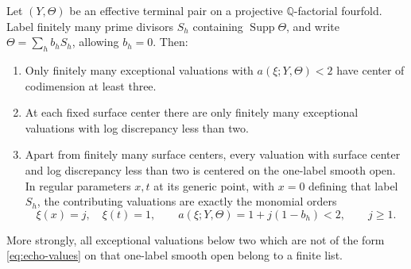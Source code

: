 \begin{lemma}\label{lem:echoes}
Let $(Y,\Theta)$ be an effective terminal pair on a projective $\mathbb Q$-factorial fourfold. Label finitely many prime divisors $S_h$ containing $\operatorname{Supp}\Theta$, and write
$\Theta=\sum_hb_hS_h$, allowing $b_h=0$.
Then:
\begin{enumerate}[label=\textup{(\roman*)}]
\item Only finitely many exceptional valuations with $a(\xi;Y,\Theta)<2$ have center of codimension at least three.
\item At each fixed surface center there are only finitely many exceptional valuations with log discrepancy less than two.
\item Apart from finitely many surface centers, every valuation with surface center and log discrepancy less than two is centered on the one-label smooth open. In regular parameters $x,t$ at its generic point, with $x=0$ defining that label $S_h$, the contributing valuations are exactly the monomial orders
\begin{equation}\label{eq:echo-values}
 \xi(x)=j,\quad \xi(t)=1,\qquad
 a(\xi;Y,\Theta)=1+j(1-b_h)<2,\qquad j\geq1.
\end{equation}
\end{enumerate}
More strongly, all exceptional valuations below two which are not of the form \eqref{eq:echo-values} on that one-label smooth open belong to a finite list.
\end{lemma}

